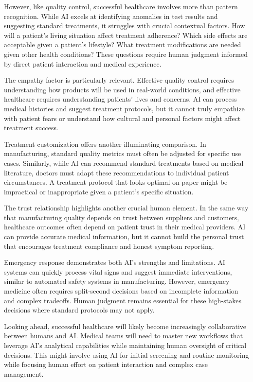 \documentclass[
  Letterpaper,
]{scrbook}
\begin{document}
However, like quality control, successful healthcare involves more than
pattern recognition. While AI excels at identifying anomalies in test
results and suggesting standard treatments, it struggles with crucial
contextual factors. How will a patient's living situation affect
treatment adherence? Which side effects are acceptable given a patient's
lifestyle? What treatment modifications are needed given other health
conditions? These questions require human judgment informed by direct
patient interaction and medical experience.

The empathy factor is particularly relevant. Effective quality control
requires understanding how products will be used in real-world
conditions, and effective healthcare requires understanding patients'
lives and concerns. AI can process medical histories and suggest
treatment protocols, but it cannot truly empathize with patient fears or
understand how cultural and personal factors might affect treatment
success.

Treatment customization offers another illuminating comparison. In
manufacturing, standard quality metrics must often be adjusted for
specific use cases. Similarly, while AI can recommend standard
treatments based on medical literature, doctors must adapt these
recommendations to individual patient circumstances. A treatment
protocol that looks optimal on paper might be impractical or
inappropriate given a patient's specific situation.

The trust relationship highlights another crucial human element. In the
same way that manufacturing quality depends on trust between suppliers
and customers, healthcare outcomes often depend on patient trust in
their medical providers. AI can provide accurate medical information,
but it cannot build the personal trust that encourages treatment
compliance and honest symptom reporting.

Emergency response demonstrates both AI's strengths and limitations. AI
systems can quickly process vital signs and suggest immediate
interventions, similar to automated safety systems in manufacturing.
However, emergency medicine often requires split-second decisions based
on incomplete information and complex tradeoffs. Human judgment remains
essential for these high-stakes decisions where standard protocols may
not apply.

Looking ahead, successful healthcare will likely become increasingly
collaborative between humans and AI. Medical teams will need to master
new workflows that leverage AI's analytical capabilities while
maintaining human oversight of critical decisions. This might involve
using AI for initial screening and routine monitoring while focusing
human effort on patient interaction and complex case management.
\end{document}

